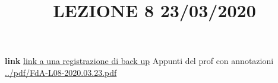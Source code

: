 \title{LEZIONE 8 23/03/2020}\newline
\textbf{link} \href{https://onedrive.live.com/?authkey=%21AATVJK3srNwxGzs&id=EE092FF4FF7B5B0E%212158&cid=EE092FF4FF7B5B0E}{link a una registrazione di back up}\newline
\newline
Appunti del prof con annotazioni \url{../pdf/FdA-L08-2020.03.23.pdf}
\begin{comment}
\section{Esercitazione 1}
\subsection{Es. 1}
Dato il sistema
\[
    \begin{cases}
        \dot{x}_1 = -2 x_1 + 6 x_2 + u\\
        \dot{x}_2 = -2x_1 + 5 x_2
    \end{cases}
\]
\begin{itemize}
    \item Stabilità del sistema (AS/S/I)?
    \item ponendo $x(0) = \left[\begin{matrix}
        1\\0
    \end{matrix}\right]$ e $u(t) = sca(t)$, quanto vale $x(t)$ per $t\geq 0$?
\end{itemize}
\textbf{Stabilità}:
\[
    A= \left[\begin{matrix}
        -2 & 6 \\ -2 &5
    \end{matrix}\right]
\]
Senza fare conti aggiuntivi ci accorgiamo che la traccia $tr(A)$ è positiva e quindi il sistema è instabile.\newline
\newline
\textbf{Movimento dello stato}:\newline
Lo facciamo in più di un modo.\newline
\newline
\textbf{Primo metodo:} iniziamo calcolando il movimento libero $x_L(t)$ tramite $e^{At}$ e poi il movimento forzato $x_F(t)$ con la trasformata di Laplace.\newline
Calcoliamo gli autovalori di $A$: 
\[
    det(sI-A) = 0
\]
\[
    det \left[\begin{matrix}
        s+2 & -6 \\ 2 & s-5

\end{comment}

